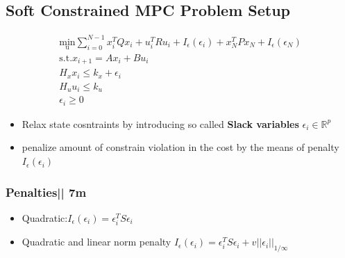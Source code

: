 \subsection{Soft Constrained MPC Problem Setup}
\begin{gather*}
    \underset{\mathrm{u}}{\mathrm{min}}\sum^{N-1}_{i=0}x_i^T Q x_i + u_i^T R u_i + I_\epsilon(\epsilon_i) + x_N^T P x_N+ I_\epsilon(\epsilon_N)\\
    \mathrm{s.t.} x_{i+1} = Ax_i+ Bu_i\\
    H_x x_i \leq k_x + \epsilon_i\\
    H_u u_i\leq k_u\\
    \epsilon_i\geq 0
\end{gather*}
\begin{itemize}
    \item Relax state cosntraints by introducing so called \textbf{Slack variables} $\epsilon_i \in \mathbb{R}^p$
    \item penalize amount of constrain violation in the cost by the means of penalty $I_\epsilon(\epsilon_i)$
\end{itemize}
\subsubsection{Penalties|| 7m}
\begin{itemize}
    \item Quadratic:$I_\epsilon(\epsilon_i) = \epsilon_i^T S \epsilon_i$
    \item Quadratic and linear norm penalty $I_\epsilon(\epsilon_i) = \epsilon_i^TS\epsilon_i+v||\epsilon_i||_{1/\infty}$
\end{itemize}

